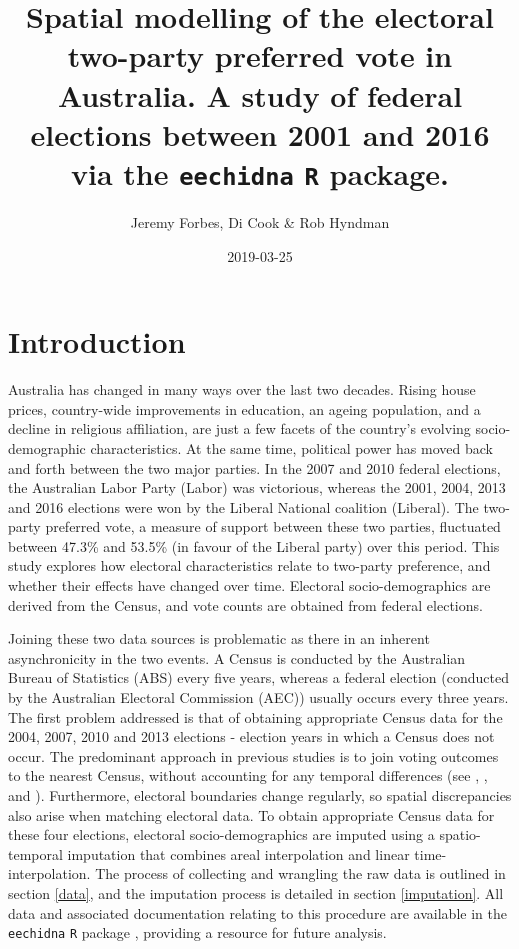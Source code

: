 \documentclass[openany]{book}
\title{Spatial modelling of the electoral two-party preferred vote in Australia. A study of federal elections between 2001 and 2016 via the \texttt{eechidna} \texttt{R} package.}
\author{Jeremy Forbes, Di Cook \& Rob Hyndman}
\date{2019-03-25}
\begin{document}
\maketitle

{
\setcounter{tocdepth}{1}
\tableofcontents
}
\hypertarget{intro}{%
\chapter{Introduction}\label{intro}}

Australia has changed in many ways over the last two decades. Rising house prices, country-wide improvements in education, an ageing population, and a decline in religious affiliation, are just a few facets of the country's evolving socio-demographic characteristics. At the same time, political power has moved back and forth between the two major parties. In the 2007 and 2010 federal elections, the Australian Labor Party (Labor) was victorious, whereas the 2001, 2004, 2013 and 2016 elections were won by the Liberal National coalition (Liberal). The two-party preferred vote, a measure of support between these two parties, fluctuated between 47.3\% and 53.5\% (in favour of the Liberal party) over this period. This study explores how electoral characteristics relate to two-party preference, and whether their effects have changed over time. Electoral socio-demographics are derived from the Census, and vote counts are obtained from federal elections.

Joining these two data sources is problematic as there in an inherent asynchronicity in the two events. A Census is conducted by the Australian Bureau of Statistics (ABS) every five years, whereas a federal election (conducted by the Australian Electoral Commission (AEC)) usually occurs every three years. The first problem addressed is that of obtaining appropriate Census data for the 2004, 2007, 2010 and 2013 elections - election years in which a Census does not occur. The predominant approach in previous studies is to join voting outcomes to the nearest Census, without accounting for any temporal differences (see \citet{DavisStimson98}, \citet{Stimson06}, \citet{Liao09} and \citet{Stimson09}). Furthermore, electoral boundaries change regularly, so spatial discrepancies also arise when matching electoral data. To obtain appropriate Census data for these four elections, electoral socio-demographics are imputed using a spatio-temporal imputation that combines areal interpolation \citep{Goodchild1993} and linear time-interpolation. The process of collecting and wrangling the raw data is outlined in section \ref{data}, and the imputation process is detailed in section \ref{imputation}. All data and associated documentation relating to this procedure are available in the \texttt{eechidna} \texttt{R} package \citep{eechidna}, providing a resource for future analysis.
\end{document}

